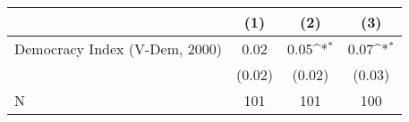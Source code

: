 {
\def\sym#1{\ifmmode^{#1}\else\(^{#1}\)\fi}
\begin{tabular}{l*{3}{c}}
\hline\hline
                    &\multicolumn{1}{c}{(1)}         &\multicolumn{1}{c}{(2)}         &\multicolumn{1}{c}{(3)}         \\
\hline
Democracy Index (V-Dem, 2000)&        0.02         &        0.05\sym{*}  &        0.07\sym{*}  \\
                    &      (0.02)         &      (0.02)         &      (0.03)         \\
\hline
N                   &         101         &         101         &         100         \\
\hline\hline
\end{tabular}
}
